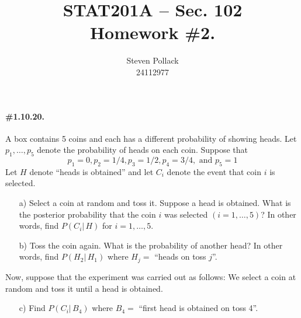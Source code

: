 \documentclass[12pt,titlepage]{article}
\title{STAT201A -- Sec. 102 \\ Homework \#2. }
\author{Steven Pollack \\ 24112977}
\date{}
\newcommand{\given}[1]{ \left| \, {#1} \right.}
\begin{document}
\maketitle

\pagestyle{empty}
\newpage
\pagestyle{fancy}

\paragraph{\#1.10.20.} A box contains 5 coins and each has a different probability of showing heads. Let $p_1, \ldots, p_5$ denote the probability of heads on each coin. Suppose that
\[
p_1 = 0, p_2 = 1/4, p_3 = 1/2, p_4 = 3/4, \text{ and } p_{5} = 1
\]
Let $H$ denote ``heads is obtained'' and let $C_i$ denote the event that coin $i$ is selected. 
\begin{enumerate}
\item[a)] Select a coin at random and toss it. Suppose a head is obtained. What is the posterior probability that the coin $i$ was selected $(i=1,\ldots, 5)$? In other words, find $P(C_i \given{H})$ for $i=1,\ldots, 5$. 
\item[b)] Toss the coin again. What is the probability of another head? In other words, find $P(H_2 \given{H_1})$ where $H_{j} =$ ``heads on toss $j$''. 
\end{enumerate}
Now, suppose that the experiment was carried out as follows: We select a coin at random and toss it until a head is obtained.
\begin{enumerate}
\item[c)] Find $P(C_i \given{B_4})$ where $B_{4} =$ ``first head is obtained on toss 4''.
\end{enumerate}
\end{document}
